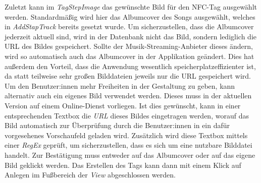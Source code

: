 \documentclass[10pt, a4paper]{article}
\begin{document}
\begin{onehalfspace}
Zuletzt kann im \textit{TagStepImage} das gewünschte Bild für den NFC-Tag ausgewählt werden.
Standardmäßig wird hier das Albumcover des Songs ausgewählt, welches in \textit{AddStapTrack} bereits gesetzt wurde.
Um sicherzustellen, dass die Albumcover jederzeit aktuell sind, wird in der Datenbank nicht das Bild, sondern lediglich die URL des Bildes gespeichert.
Sollte der Musik-Streaming-Anbieter dieses ändern, wird so automatisch auch das Albumcover in der Applikation geändert.
Dies hat außerdem den Vorteil, dass die Anwendung wesentlich speicherplatzeffizienter ist, da statt teilweise sehr großen Bilddateien jeweils nur die URL gespeichert wird.
Um den Benutzer:innen mehr Freiheiten in der Gestaltung zu geben, kann alternativ auch ein eigenes Bild verwendet werden.
Dieses muss in der aktuellen Version auf einem Online-Dienst vorliegen.
Ist dies gewünscht, kann in einer entsprechenden Textbox die \textit{URL} dieses Bildes eingetragen werden, worauf das Bild automatisch zur Überprüfung durch die Benutzer:innen in ein dafür vorgesehenes Vorschaufeld geladen wird.
Zusätzlich wird diese Textbox mittels einer \textit{RegEx} geprüft, um sicherzustellen, dass es sich um eine nutzbare Bilddatei handelt.
Zur Bestätigung muss entweder auf das Albumcover oder auf das eigene Bild geklickt werden.
Das Erstellen des Tags kann dann mit einem Klick auf \glqq Anlegen\grqq{} im Fußbereich der \textit{View} abgeschlossen werden.


\end{onehalfspace}
\end{document}
